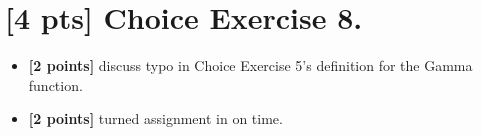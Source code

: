 \documentclass{article}
\begin{document}
\section*{[4 pts] Choice Exercise 8.}

\begin{itemize}
    \item \textbf{[2 points]} discuss typo in Choice Exercise 5's definition for the Gamma function.
    \item \textbf{[2 points]} turned assignment in on time.
\end{itemize}
\end{document}
